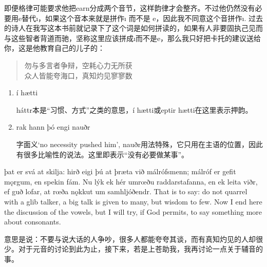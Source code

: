 \begin{translation*}{}
  即便格律可能要求他把earn分成两个音节，这样韵律才会整齐。不过他仍然没有必要用e替代ı，如果这个音本来就是拼作ı 而不是 e，因此我不同意这个音拼作ı. 过去的诗人在我写这本书前就记录下了这个词是如何拼读的，如果有人非要固执己见而与这些智者背道而驰，坚称这里应该拼成ı而不是e，那么我只好把卡托的建议送给你，这是他教育自己的儿子的：
  \begin{quote}
    勿与多言者争辩，空耗心力无所获\\
    众人皆能夸海口，真知灼见寥寥数
  \end{quote}

\end{translation*}
\begin{grammar*}{}
  \begin{enumerate}[leftmargin=*]
    \item í hætti

          háttr本是“习惯、方式”之类的意思，í hætti或eptir hætti在这里表示押韵。

    \item rak hann þó engi nauðr

          字面义`no necessity pushed him', nauðr用法特殊，它只用在主语的位置，因此有很多比喻性的说法。这里即表示“没有必要做某事”。
  \end{enumerate}
\end{grammar*}
\begin{paracol}{2}
  þat er svá at skilja: hirð eigi þú at þræta við málrófsmenn; málróf er gefit mǫrgum, en spekin fám. Nu lýk ek hér umrœðu raddarstafanna, en ek leita viðr, ef guð lofar, at rœða nǫkkut um samhljóðendr.
  \switchcolumn
  That is to say: do not quarrel with a glib talker, a big talk is given to many, but wisdom to few. Now I end here the discussion of the vowels, but I will try, if God permits, to say something more about consonants.
\end{paracol}
\begin{translation*}{}
  意思是说：不要与说大话的人争吵，很多人都能夸夸其谈，而有真知灼见的人却很少。对于元音的讨论到此为止，接下来，若是上苍助我，我再讨论一点关于辅音的事。
\end{translation*}

